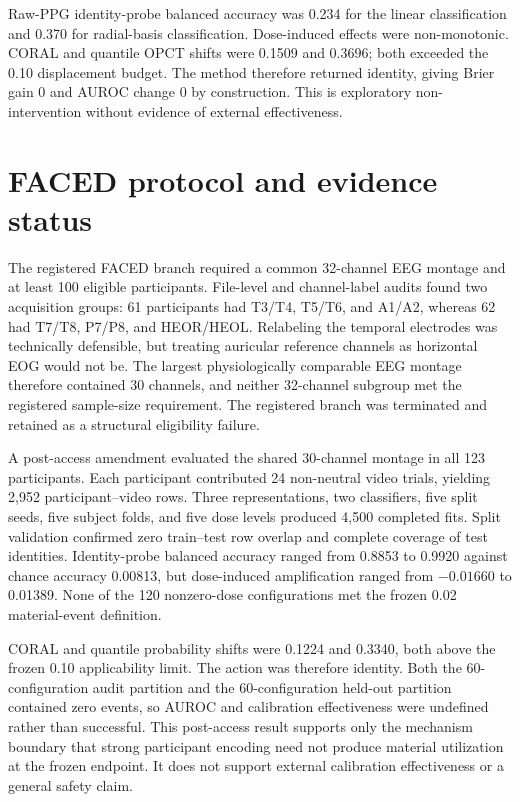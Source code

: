 \documentclass[preprint,12pt]{elsarticle}
\begin{document}
Raw-PPG identity-probe balanced accuracy was 0.234 for the linear classification and 0.370 for radial-basis classification. Dose-induced effects were non-monotonic. CORAL and quantile OPCT shifts were 0.1509 and 0.3696; both exceeded the 0.10 displacement budget. The method therefore returned identity, giving Brier gain 0 and AUROC change 0 by construction. This is exploratory non-intervention without evidence of external effectiveness.

\section{FACED protocol and evidence status}

The registered FACED branch required a common 32-channel EEG montage and at least 100 eligible participants. File-level and channel-label audits found two acquisition groups: 61 participants had T3/T4, T5/T6, and A1/A2, whereas 62 had T7/T8, P7/P8, and HEOR/HEOL. Relabeling the temporal electrodes was technically defensible, but treating auricular reference channels as horizontal EOG would not be. The largest physiologically comparable EEG montage therefore contained 30 channels, and neither 32-channel subgroup met the registered sample-size requirement. The registered branch was terminated and retained as a structural eligibility failure.

A post-access amendment evaluated the shared 30-channel montage in all 123 participants. Each participant contributed 24 non-neutral video trials, yielding 2,952 participant--video rows. Three representations, two classifiers, five split seeds, five subject folds, and five dose levels produced 4,500 completed fits. Split validation confirmed zero train--test row overlap and complete coverage of test identities. Identity-probe balanced accuracy ranged from 0.8853 to 0.9920 against chance accuracy 0.00813, but dose-induced amplification ranged from $-0.01660$ to 0.01389. None of the 120 nonzero-dose configurations met the frozen 0.02 material-event definition.

CORAL and quantile probability shifts were 0.1224 and 0.3340, both above the frozen 0.10 applicability limit. The action was therefore identity. Both the 60-configuration audit partition and the 60-configuration held-out partition contained zero events, so AUROC and calibration effectiveness were undefined rather than successful. This post-access result supports only the mechanism boundary that strong participant encoding need not produce material utilization at the frozen endpoint. It does not support external calibration effectiveness or a general safety claim.
\end{document}
